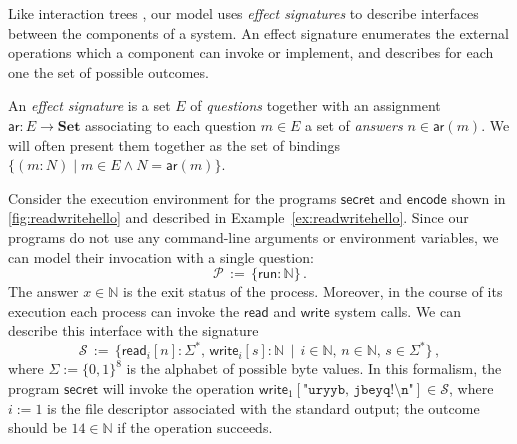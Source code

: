 \documentclass[acmsmall,screen,review,anonymous,nonacm]{acmart}
\newcommand{\kw}[1]{\ensuremath{ \mathsf{#1} }}
\begin{document}
Like interaction trees \cite{itrees},
our model uses \emph{effect signatures}
to describe interfaces between the components of a system.
An effect signature enumerates
the external operations which
a component can invoke or implement,
and describes for each one
the set of possible outcomes.

\begin{definition} \label{def:esig}
An \emph{effect signature} is a set $E$ of \emph{questions}
together with an assignment $\kw{ar} : E \rightarrow \mathbf{Set}$
associating to each question $m \in E$
a set of \emph{answers} $n \in \kw{ar}(m)$.
We will often present them together as the set of bindings
$\{ (m \mathbin: N) \mid m \in E \wedge N = \kw{ar}(m) \}$.
\end{definition}


\begin{example} \label{ex:fdsig} %
Consider the execution environment
for the programs \kw{secret} and \kw{encode}
shown in \autoref{fig:readwritehello} and
described in Example~\ref{ex:readwritehello}.
Since our programs
do not use any command-line arguments or environment variables,
we can model their invocation with a single question:
\[
  \mathcal{P} \, := \,
    \{ \kw{run} : \mathbb{N} \}
  \,.
\]
The answer $x \in \mathbb{N}$ is the exit status of the process.
Moreover, in the course of its execution
each process can invoke the \kw{read} and \kw{write} system calls.
We can describe this interface with the signature
\[
  \mathcal{S} \, := \, \{
    \kw{read}_i[n] \mathbin: \Sigma^* , \,
    \kw{write}_i[s] \mathbin: \mathbb{N} \, \mid \,
    i \in \mathbb{N}, \,
    n \in \mathbb{N}, \,
    s \in \Sigma^*
  \}
  \,,
\]
where $\Sigma := \{0,1\}^8$ is the alphabet of possible byte values.
In this formalism,
the program \kw{secret} will invoke
the operation
$\kw{write}_1[\texttt{"uryyb, jbeyq!\textbackslash{}n"}]
 \in \mathcal{S}$,
where $i := 1$ is the file descriptor associated with the standard output;
the outcome should be $14 \in \mathbb{N}$
if the operation succeeds.
\end{example}
\end{document}

